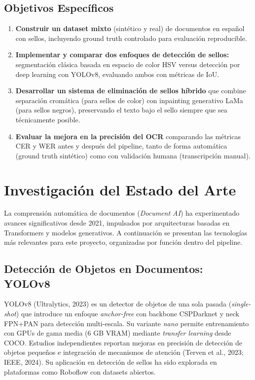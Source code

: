 \documentclass[11pt, a4paper]{article}
\begin{document}
\subsection{Objetivos Específicos}

\begin{enumerate}[leftmargin=1.5em]
    \item \textbf{Construir un dataset mixto} (sintético y real) de documentos en español con sellos, incluyendo ground truth controlado para evaluación reproducible.
    
    \item \textbf{Implementar y comparar dos enfoques de detección de sellos:} segmentación clásica basada en espacio de color HSV versus detección por deep learning con YOLOv8, evaluando ambos con métricas de IoU.
    
    \item \textbf{Desarrollar un sistema de eliminación de sellos híbrido} que combine separación cromática (para sellos de color) con inpainting generativo LaMa (para sellos negros), preservando el texto bajo el sello siempre que sea técnicamente posible.
    
    \item \textbf{Evaluar la mejora en la precisión del OCR} comparando las métricas CER y WER antes y después del pipeline, tanto de forma automática (ground truth sintético) como con validación humana (transcripción manual).
\end{enumerate}

\section{Investigación del Estado del Arte}

La comprensión automática de documentos (\textit{Document AI}) ha experimentado avances significativos desde 2021, impulsados por arquitecturas basadas en Transformers y modelos generativos. A continuación se presentan las tecnologías más relevantes para este proyecto, organizadas por función dentro del pipeline.

\subsection{Detección de Objetos en Documentos: YOLOv8}

YOLOv8 (Ultralytics, 2023) es un detector de objetos de una sola pasada (\textit{single-shot}) que introduce un enfoque \textit{anchor-free} con backbone CSPDarknet y neck FPN+PAN para detección multi-escala. Su variante \textit{nano} permite entrenamiento con GPUs de gama media (6 GB VRAM) mediante \textit{transfer learning} desde COCO. Estudios independientes reportan mejoras en precisión de detección de objetos pequeños e integración de mecanismos de atención (Terven et al., 2023; IEEE, 2024). Su aplicación en detección de sellos ha sido explorada en plataformas como Roboflow con datasets abiertos.
\end{document}
